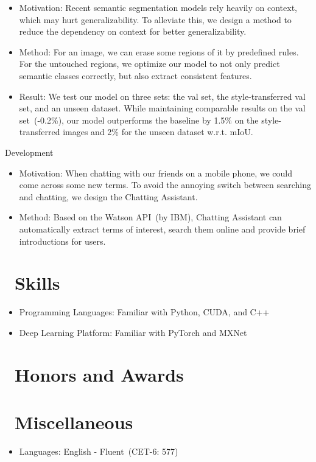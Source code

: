 \documentclass{resume}
\begin{document}
\begin{itemize}
	\item Motivation: Recent semantic segmentation models rely heavily on context, which may hurt generalizability. To alleviate this, we design a method to reduce the dependency on context for better generalizability.
	\item Method: For an image, we can erase some regions of it by predefined rules. For the untouched regions, we optimize our model to not only predict semantic classes correctly, but also extract consistent features.
	\item Result: We test our model on three sets: the val set, the style-transferred val set, and an unseen dataset. While maintaining comparable results on the val set~(-0.2\%), our model outperforms the baseline by 1.5\% on the style-transferred images and 2\% for the unseen dataset w.r.t. mIoU.
\end{itemize}

 {Development}
\begin{itemize}
	\item Motivation: When chatting with our friends on a mobile phone, we could come across some new terms. To avoid the annoying switch between searching and chatting, we design the Chatting Assistant. 
	\item Method: Based on the Watson API~(by IBM), Chatting Assistant can automatically extract terms of interest, search them online and provide brief introductions for users.
\end{itemize}



\section{\faCogs\ Skills}
\begin{itemize}[parsep=0.5ex]
  \item Programming Languages: Familiar with Python, CUDA, and C++
  \item Deep Learning Platform: Familiar with PyTorch and MXNet
\end{itemize}

\section{\faHeartO\ Honors and Awards}

\section{\faInfo\ Miscellaneous}
\begin{itemize}
  \item Languages: English - Fluent~(CET-6: 577)
\end{itemize}

%
%
\end{document}

